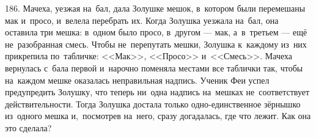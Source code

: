 186. Мачеха, уезжая на бал, дала Золушке мешок, в котором были перемешаны мак и просо, и велела перебрать их. Когда Золушка уезжала на бал, она оставила три мешка: в одном было просо, в другом --- мак, а в третьем --- ещё не разобранная смесь. Чтобы не перепутать мешки, Золушка к каждому из них прикрепила по табличке: <<Мак>>, <<Просо>> и <<Смесь>>. Мачеха вернулась с бала первой и нарочно поменяла местами все таблички так, чтобы на каждом мешке оказалась неправильная надпись. Ученик Феи успел предупредить Золушку, что теперь ни одна надпись на мешках не соответствует действительности. Тогда Золушка достала только одно-единственное зёрнышко из одного мешка и, посмотрев на него, сразу догадалась, где что лежит. Как она это сделала?\\
